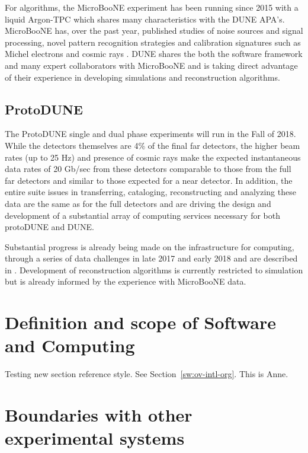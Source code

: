 For algorithms, the MicroBooNE\cite{Acciarri:2016smi} experiment has been running since 2015 with a liquid Argon-TPC which shares many characteristics with the DUNE APA's.   MicroBooNE has, over the past year, published studies of noise sources and signal processing\cite{Acciarri:2017sde,Adams:2018dra}, novel pattern recognition strategies \cite{Acciarri:2016ryt,Acciarri:2017hat} and calibration signatures such as Michel electrons and cosmic rays \cite{Acciarri:2017sjy,Acciarri:2017sde}.  DUNE shares the both the \larsoft software framework and many expert collaborators with MicroBooNE and is taking direct advantage of their experience in developing simulations and reconstruction algorithms.


\subsection{ProtoDUNE}\label{sw:PD-planning}

The ProtoDUNE single and dual phase experiments will run in the Fall of 2018.  While the detectors themselves are 4\% of the final far detectors, the higher beam rates (up to 25 Hz) and presence of cosmic rays make the expected instantaneous data rates of 20 Gb/sec from these detectors comparable to those from the full far detectors and similar to those expected for a near detector. 
In addition, the entire suite issues in transferring, cataloging, reconstructing and analyzing these data are the same as for the full detectors and are driving the design and development of a substantial array of computing services necessary for both protoDUNE and DUNE.

Substantial progress is already being made on the infrastructure for computing, through a series of data challenges in late 2017 and early 2018 and are described in 
.  Development of reconstruction algorithms is currently restricted to simulation but is already informed by the experience with MicroBooNE data.


\section{Definition and scope of Software and Computing}

Testing new section reference style. See Section~\ref{sw:ov-intl-org}. This is Anne.
\section{Boundaries with other experimental systems}
